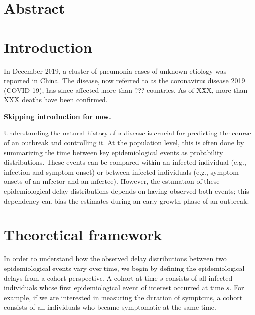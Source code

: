 \documentclass[12pt]{article}
\date{\today}
\begin{document}
\begin{flushleft}{
	\Large
	\textbf{}
}
\end{flushleft}

\section*{Abstract}

\pagebreak

\section{Introduction}

In December 2019, a cluster of pneumonia cases of unknown etiology was reported in China.
The disease, now referred to as the coronavirus disease 2019 (COVID-19), has since affected more than ??? countries.
As of XXX, more than XXX deaths have been confirmed.



\textbf{Skipping introduction for now.}

Understanding the natural history of a disease is crucial for predicting the course of an outbreak and controlling it.
At the population level, this is often done by summarizing the time between key epidemiological events as probability distributions.
These events can be compared within an infected individual (e.g., infection and symptom onset) or between infected individuals (e.g., symptom onsets of an infector and an infectee).
However, the estimation of these epidemiological delay distributions depends on having observed both events;
this dependency can bias the estimates during an early growth phase of an outbreak.

\section{Theoretical framework}

In order to understand how the observed delay distributions between two epidemiological events vary over time, we begin by defining the epidemiological delays from a cohort perspective.
A cohort at time $s$ consists of all infected individuals whose first epidemiological event of interest occurred at time $s$.
For example, if we are interested in measuring the duration of symptoms, a cohort consists of all individuals who became symptomatic at the same time.
\end{document}
